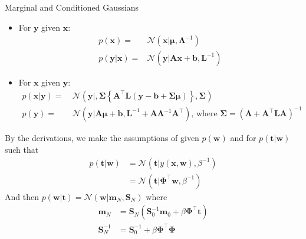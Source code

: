 
\begin{frame}{\insertsubsection}

\begin{block}{Marginal and Conditioned Gaussians}

\begin{itemize}
\item \textcolor{UniGold}{For $\mathbf{y}$ given $\mathbf{x}$:}
\begin{align*}
	p\left( \mathbf{x} \right) =& \mathcal{N} \left( \mathbf{x}|\boldsymbol{\mu}, \boldsymbol{\Lambda}^{-1} \right) \\
	p\left( \mathbf{y} | \mathbf{x} \right) =& \mathcal{N} \left( \mathbf{y}|\mathbf{Ax}+\mathbf{b}, \mathbf{L}^{-1} \right)
\end{align*}

\item \textcolor{UniGold}{For $\mathbf{x}$ given $\mathbf{y}$:}
\begin{align*}
p\left( \mathbf{x} | \mathbf{y} \right) =& \ \mathcal{N}\left( \mathbf{y}| ,  \boldsymbol{\Sigma} \left\{ \mathbf{A}^{\top} \mathbf{L}(\mathbf{y}-\mathbf{b} + \boldsymbol{\Sigma \mu}) \right\}, \boldsymbol{\Sigma} \right) \\
p\left( \mathbf{y} \right) =& \ \mathcal{N}\left( \mathbf{y}|\mathbf{A} \boldsymbol{\mu} + \mathbf{b}, \mathbf{L}^{-1} + \mathbf{A}\boldsymbol{\Lambda}^{-1}\mathbf{A}^{\top} \right) \text{, where } \boldsymbol{\Sigma} = \left(  \boldsymbol{\Lambda} + \mathbf{A}^{\top} \mathbf{LA} \right)^{-1}
\end{align*}
\end{itemize}

\end{block}
\end{frame}

\begin{frame}{\insertsubsection}
	By the derivations, we make the assumptions of given $p(\mathbf{w})$ and  for $p(\mathbf{t}|\mathbf{w})$ such that 
	\begin{align*}
		p(\mathbf{t}|\mathbf{w}) &= \mathcal{N}\left( \mathbf{t}|y(\mathbf{x},\mathbf{w}), \beta^{-1} \right)	\\
		&= \mathcal{N}\left( \mathbf{t}|\boldsymbol{\Phi}^{\top}\mathbf{w}, \beta^{-1} \right)
	\end{align*}
	And then $p(\mathbf{w}|\mathbf{t}) = \mathcal{N}\left( \mathbf{w}|\mathbf{m}_N, \mathbf{S}_N \right)$ where
	\begin{align*}
		\mathbf{m}_N &= \mathbf{S}_N \left( \mathbf{S}_0^{-1}\mathbf{m}_0 + \beta \boldsymbol{\Phi}^{\top}\mathbf{t}  \right) \\
		\mathbf{S}_N^{-1} &= \mathbf{S}_0^{-1} + \beta\boldsymbol{\Phi}^{\top}\boldsymbol{\Phi}
	\end{align*}
\end{frame}


